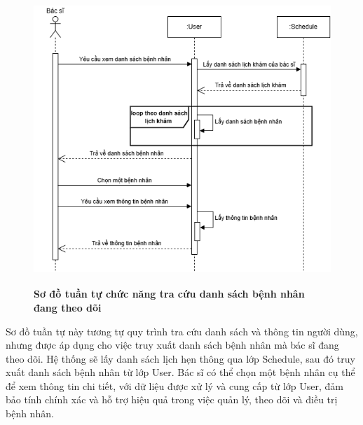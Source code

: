 \begin{figure}[H]
	\centering
	\includegraphics[width=12.8cm,height=11cm]{Images/sequence/user/getPatientByDoctor.drawio.png}
	\caption[Sơ đồ tuần tự chức năng tra cứu danh sách bệnh nhân đang theo dõi]{\bfseries \fontsize{12pt}{0pt}
		\selectfont Sơ đồ tuần tự chức năng tra cứu danh sách bệnh nhân đang theo dõi}
	\label{sequence_get_patient} %
\end{figure}
Sơ đồ tuần tự này tương tự quy trình tra cứu danh sách và thông tin người dùng, nhưng được áp dụng cho việc truy xuất danh sách bệnh nhân mà bác sĩ đang theo dõi.
Hệ thống sẽ lấy danh sách lịch hẹn thông qua lớp Schedule, sau đó truy xuất danh sách bệnh nhân từ lớp User. Bác sĩ có thể chọn một bệnh nhân cụ thể để xem thông tin chi tiết,
với dữ liệu được xử lý và cung cấp từ lớp User, đảm bảo tính chính xác và hỗ trợ hiệu quả trong việc quản lý, theo dõi và điều trị bệnh nhân.

